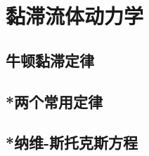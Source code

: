 

\section{黏滞流体动力学}\label{9-3}

\subsection{牛顿黏滞定律}\label{9-3-1}

\subsection{*两个常用定律}\label{9-3-2}

\subsection{*纳维-斯托克斯方程}\label{9-3-3}